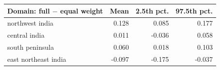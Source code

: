 \begin{tabular}{lrrr}
\toprule
Domain: full $-$ equal weight & Mean & 2.5th pct. & 97.5th pct. \\
\midrule
northwest india & 0.128 & 0.085 & 0.177 \\
central india & 0.011 & -0.036 & 0.058 \\
south peninsula & 0.060 & 0.018 & 0.103 \\
east northeast india & -0.097 & -0.175 & -0.037 \\
\bottomrule
\end{tabular}

